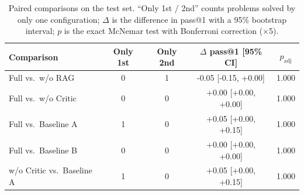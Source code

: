 \begin{table}[t]
\centering
\caption{Paired comparisons on the test set. ``Only 1st / 2nd'' counts problems solved by only one configuration; $\Delta$ is the difference in pass@1 with a 95\% bootstrap interval; $p$ is the exact McNemar test with Bonferroni correction ($\times$5).}
\label{tab:pairs}
\footnotesize
\setlength{\tabcolsep}{3pt}
\begin{tabular}{lcccc}
\hline
Comparison & Only 1st & Only 2nd & $\Delta$ pass@1 [95\% CI] & $p_{\mathrm{adj}}$ \\
\hline
Full vs.\ w/o RAG & 0 & 1 & -0.05 [-0.15, +0.00] & 1.000 \\
Full vs.\ w/o Critic & 0 & 0 & +0.00 [+0.00, +0.00] & 1.000 \\
Full vs.\ Baseline A & 1 & 0 & +0.05 [+0.00, +0.15] & 1.000 \\
Full vs.\ Baseline B & 0 & 0 & +0.00 [+0.00, +0.00] & 1.000 \\
w/o Critic vs.\ Baseline A & 1 & 0 & +0.05 [+0.00, +0.15] & 1.000 \\
\hline
\end{tabular}
\end{table}
